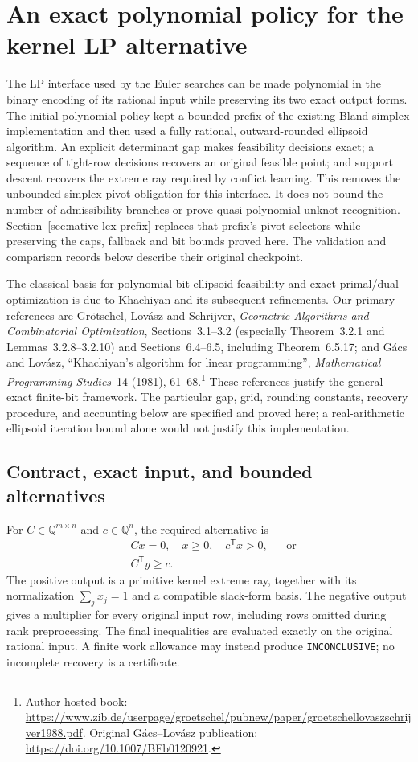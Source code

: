 \section{An exact polynomial policy for the kernel LP alternative}
\label{sec:exact-polynomial-lp}

The LP interface used by the Euler searches can be made polynomial in the
binary encoding of its rational input while preserving its two exact output
forms.  The initial polynomial policy kept a bounded prefix of the existing
Bland simplex implementation and then used a fully rational, outward-rounded
ellipsoid algorithm.  An explicit determinant gap makes feasibility decisions
exact; a sequence of tight-row decisions recovers an original feasible point;
and support descent recovers the extreme ray required by conflict learning.
This removes the unbounded-simplex-pivot obligation for this interface.  It
does not bound the number of admissibility branches or prove quasi-polynomial
unknot recognition.
Section~\ref{sec:native-lex-prefix} replaces that prefix's pivot selectors
while preserving the caps, fallback and bit bounds proved here.  The
validation and comparison records below describe their original checkpoint.

The classical basis for polynomial-bit ellipsoid feasibility and exact
primal/dual optimization is due to Khachiyan and its subsequent refinements.
Our primary references are Gr\"otschel, Lov\'asz and Schrijver,
\emph{Geometric Algorithms and Combinatorial Optimization},
Sections~3.1--3.2 (especially Theorem~3.2.1 and Lemmas~3.2.8--3.2.10) and
Sections~6.4--6.5, including Theorem~6.5.17; and G\'acs and Lov\'asz,
``Khachiyan's algorithm for linear programming'',
\emph{Mathematical Programming Studies}~14 (1981), 61--68.\footnote{\raggedright
Author-hosted book:
\url{https://www.zib.de/userpage/groetschel/pubnew/paper/groetschellovaszschrijver1988.pdf}.
Original G\'acs--Lov\'asz publication:
\url{https://doi.org/10.1007/BFb0120921}.}
These references justify the general exact finite-bit framework.  The
particular gap, grid, rounding constants, recovery procedure, and accounting
below are specified and proved here; a real-arithmetic ellipsoid iteration
bound alone would not justify this implementation.

\subsection{Contract, exact input, and bounded alternatives}

For $C\in\mathbb Q^{m\times n}$ and $c\in\mathbb Q^n$, the required alternative is
\begin{align*}
 &Cx=0,\quad x\ge0,\quad c^{\mathsf T}x>0,
 &&\text{or}\\
 &C^{\mathsf T}y\ge c.
\end{align*}
The positive output is a primitive kernel extreme ray, together with its
normalization $\sum_jx_j=1$ and a compatible slack-form basis.  The negative
output gives a multiplier for every original input row, including rows
omitted during rank preprocessing.  The final inequalities are evaluated
exactly on the original rational input.  A finite work allowance may instead
produce \texttt{INCONCLUSIVE}; no incomplete recovery is a certificate.

